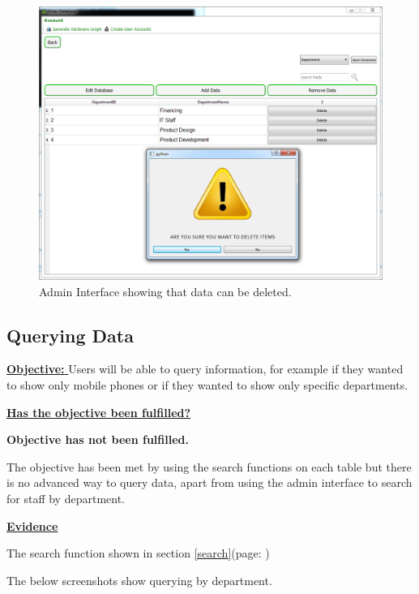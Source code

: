 \begin{figure}[H]
    \includegraphics[width=\textwidth]{./Evaluation/Images/admin3.png}
    \caption{Admin Interface showing that data can be deleted.} 
\end{figure}



\subsection{Querying Data}

\underline{\textbf{Objective:} }  Users will be able to query information, for example if they wanted to show only mobile phones or if they wanted to show only specific departments.

\underline{\textbf{Has the objective been fulfilled?}}

\textbf{Objective has not been fulfilled.}

The objective has been met by using the search functions on each table but there is no advanced way to query data, apart from using the admin interface to search for staff by department. 

\underline{\textbf{Evidence}}

The search function shown in section \ref{search}(page: \pageref{search})

The below screenshots show querying by department.


